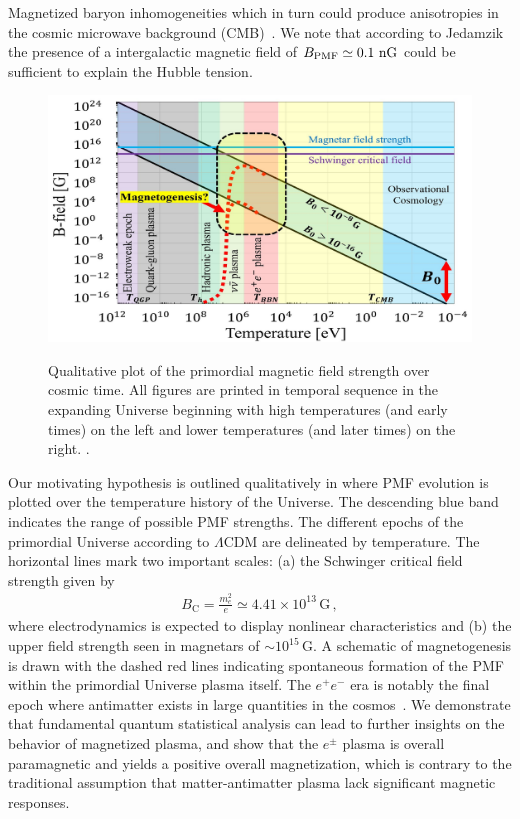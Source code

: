 Magnetized baryon inhomogeneities which in turn could produce anisotropies in the cosmic microwave background (CMB)~\cite{Jedamzik:2013gua,Abdalla:2022yfr}. We note that according to Jedamzik~\cite{Jedamzik:2020krr} the presence of a intergalactic magnetic field of $B_\mathrm{PMF}\simeq0.1{\rm\ nG}$ could be sufficient to explain the Hubble tension.

\begin{figure}
 \centering
 \includegraphics[width=0.99\linewidth]{plots/pmf.jpg}
 \caption{Qualitative plot of the primordial magnetic field strength over cosmic time. All figures are printed in temporal sequence in the expanding Universe beginning with high temperatures (and early times) on the left and lower temperatures (and later times) on the right. . }
 \label{fig:pmf}
\end{figure}

Our motivating hypothesis is outlined qualitatively in  where PMF evolution is plotted over the temperature history of the Universe. The descending blue band indicates the range of possible PMF strengths. The different epochs of the primordial Universe according to $\Lambda\mathrm{CDM}$ are delineated by temperature. The horizontal lines mark two important scales: (a) the Schwinger critical field strength given by
\begin{align}
 \label{crit:1}
 B_\mathrm{C} = \frac{m_{e}^{2}}{e}\simeq4.41\times10^{13}\,\mathrm{G}\,,
\end{align}
where electrodynamics is expected to display nonlinear characteristics and (b) the upper field strength seen in magnetars of $\sim10^{15}\,\mathrm{G}$. A schematic of magnetogenesis is drawn with the dashed red lines indicating spontaneous formation of the PMF within the primordial Universe plasma itself. The $e^{+}e^{-}$ era is notably the final epoch where antimatter exists in large quantities in the cosmos~\cite{Rafelski:2023emw}. We demonstrate that fundamental quantum statistical analysis can lead to further insights on the behavior of magnetized plasma, and show that the $e^\pm$ plasma is overall paramagnetic and yields a positive overall magnetization, which is contrary to the traditional assumption that matter-antimatter plasma lack significant magnetic responses.

